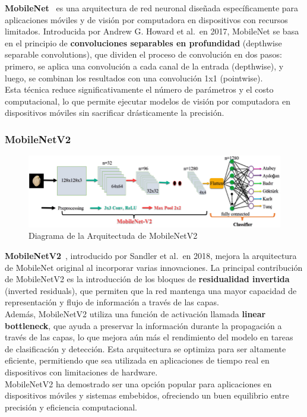 \textbf{MobileNet}~\cite{} es una arquitectura de red neuronal diseñada específicamente para aplicaciones móviles y de visión
por computadora en dispositivos con recursos limitados.
Introducida por Andrew G. Howard et al.\ en 2017, MobileNet se basa en el principio de
\textbf{convoluciones separables en profundidad} (depthwise separable convolutions), que dividen el proceso de
convolución en dos pasos: primero, se aplica una convolución a cada canal de la entrada (depthwise), y luego, se
combinan los resultados con una convolución 1x1 (pointwise). \\[6pt]

Esta técnica reduce significativamente el número de parámetros y el costo computacional, lo que permite ejecutar
modelos de visión por computadora en dispositivos móviles sin sacrificar drásticamente la precisión.

\subsubsection{MobileNetV2}\label{subsubsec:mobilenetv2}

\begin{figure}[htp] \label{fig:mobilenetv2}
    \begin{center}
        \includegraphics[width=1\textwidth]{imagenes/mobilenetv2}
    \end{center}
    \caption[MobileNetV2]{Diagrama de la Arquitectuda de MobileNetV2}
\end{figure}

\textbf{MobileNetV2}~\cite{}, introducido por Sandler et al.\ en 2018, mejora la arquitectura de MobileNet original al
incorporar varias innovaciones.
La principal contribución de MobileNetV2 es la introducción de los bloques de \textbf{residualidad invertida} (inverted
residuals), que permiten que la red mantenga una mayor capacidad de representación y flujo de información a través de
las capas. \\[6pt]

Además, MobileNetV2 utiliza una función de activación llamada \textbf{linear bottleneck}, que ayuda a preservar la
información durante la propagación a través de las capas, lo que mejora aún más el rendimiento del modelo en tareas de
clasificación y detección.
Esta arquitectura se optimiza para ser altamente eficiente, permitiendo que sea utilizada en aplicaciones de tiempo
real en dispositivos con limitaciones de hardware. \\[6pt]

MobileNetV2 ha demostrado ser una opción popular para aplicaciones en dispositivos móviles y sistemas embebidos,
ofreciendo un buen equilibrio entre precisión y eficiencia computacional.
